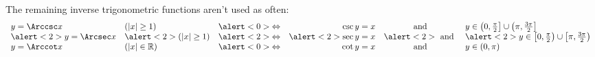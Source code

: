 \begin{frame}[t]
The remaining inverse trigonometric functions aren't used as often:
\[
\begin{array}{llcrcl}
y = \Arccsc x &%
(|x| \geq 1) &%
\alert<0>{\Leftrightarrow}&%
\csc y = x &%
\text{ and } &%
y\in \left(0,\frac{\pi}{2}\right] \cup \left(\pi , \frac{3\pi}{2} \right] \\%
\alert<2>{y = \Arcsec x }&%
\alert<2>{(|x| \geq 1) }&%
\alert<2>{\Leftrightarrow}&%
\alert<2>{\sec y = x }&%
\alert<2>{\text{ and } }&%
\alert<2>{y\in  \left[0,\frac{\pi}{2}\right) \cup \left[\pi , \frac{3\pi}{2}\right) }\\%
y = \Arccot x &%
(|x| \in \mathbb{R}) &%
\alert<0>{\Leftrightarrow}&%
\cot y = x &%
\text{ and } &%
y\in (0,\pi )
\end{array}
\]
\end{frame}
